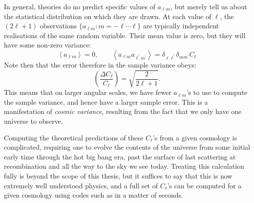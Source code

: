 In general, theories do no predict specific values of $a_{\ell m}$, but merely tell us about the statistical distribution on which they are drawn. At each value of $\ell$, the $(2\ell + 1)$ observations $\{a_{\ell m}:m=-\ell\cdots\ell\}$ are typically independent realisations of the same random variable. Their mean value is zero, but they will have some non-zero variance:
\begin{equation}
  \left\langle a_{\ell m} \right\rangle = 0, \qquad
  \left\langle a_{\ell m} a_{\ell^\prime m^\prime}\right\rangle = \delta_{\ell \ell^\prime} \delta_{m m^\prime} C_\ell
\end{equation}
Note then that the error therefore in the sample variance obeys:
\begin{equation}
  \left( \frac{\Delta C_\ell}{C_\ell} \right) = \sqrt{\frac{2}{2\ell+1}}.
\end{equation}
This means that on larger angular scales, we have fewer $a_{\ell m}$'s to use to compute the sample variance, and hence have a larger sample error. This is a manifestation of {\em cosmic variance}, resulting from the fact that we only have one universe to observe. 

Computing the theoretical predictions of these $C_\ell$'s from a given cosmology is complicated, requiring one to evolve the contents of the universe from some initial early time through the hot big bang era, past the surface of last scattering at recombination and all the way to the sky we see today. Treating this calculation fully is beyond the scope of this thesis, but it suffices to say that this is now extremely well understood physics, and a full set of $C_\ell$'s can be computed for a given cosmology using codes such as \CAMB{} in a matter of seconds.

\clearpage{}


